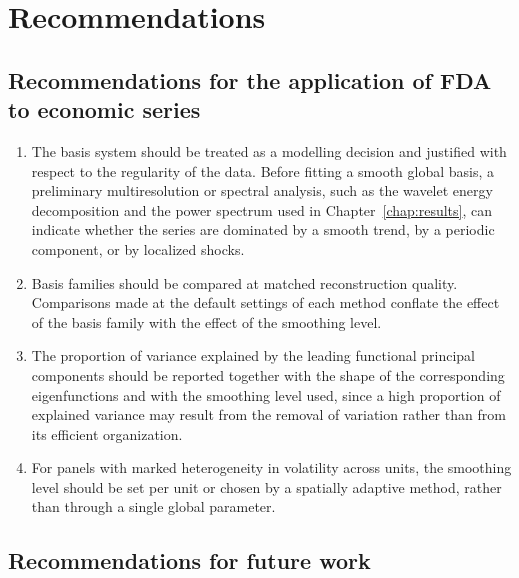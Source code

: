 \section{Recommendations}
\label{sec:recommendations}

\subsection{Recommendations for the application of FDA to economic series}

\begin{enumerate}
    \item The basis system should be treated as a modelling decision and
    justified with respect to the regularity of the data. Before fitting
    a smooth global basis, a preliminary multiresolution or spectral
    analysis, such as the wavelet energy decomposition and the power
    spectrum used in Chapter~\ref{chap:results}, can indicate whether the
    series are dominated by a smooth trend, by a periodic component, or by
    localized shocks.

    \item Basis families should be compared at matched reconstruction
    quality. Comparisons made at the default settings of each method
    conflate the effect of the basis family with the effect of the
    smoothing level.

    \item The proportion of variance explained by the leading functional
    principal components should be reported together with the shape of
    the corresponding eigenfunctions and with the smoothing level used,
    since a high proportion of explained variance may result from the
    removal of variation rather than from its efficient organization.

    \item For panels with marked heterogeneity in volatility across
    units, the smoothing level should be set per unit or chosen by a
    spatially adaptive method, rather than through a single global
    parameter.
\end{enumerate}

\subsection{Recommendations for future work}


